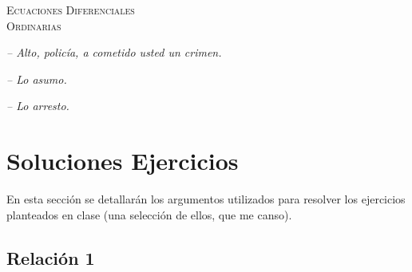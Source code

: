 \documentclass{article}
\begin{document}
\begin{titlepage}
    \begin{center}
        {\Huge \textsc{Ecuaciones Diferenciales \\ \vspace{10px} Ordinarias}}
    \end{center}

    \vspace{10px}

    \hfill{\textit{-- Alto, policía, a cometido usted un crimen.}}

    \hfill{\textit{-- Lo asumo.}}

    \hfill{\textit{-- Lo arresto.}}

    \tableofcontents
\end{titlepage}

\newpage

\section{Soluciones Ejercicios}

En esta sección se detallarán los argumentos utilizados para resolver los ejercicios planteados en clase (una selección de ellos, que me canso).

\subsection{Relación 1}
\end{document}
